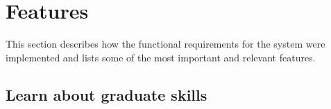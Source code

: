\documentclass{l4proj}
\begin{document}
\section{Features}

This section describes how the functional requirements for the system were implemented and lists some of the most 
important and relevant features. 

\subsection{Learn about graduate skills}
\end{document}

